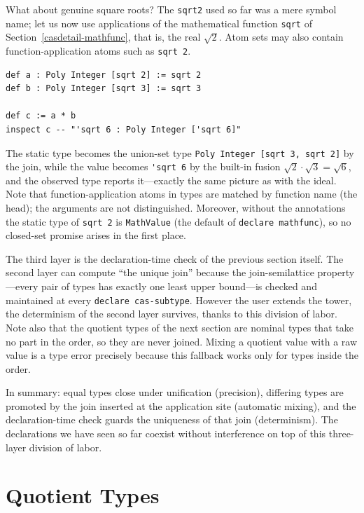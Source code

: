 What about genuine square roots?
The \lstinline{sqrt2} used so far was a mere symbol name; let us now use applications of the mathematical function \lstinline{sqrt} of Section~\ref{casdetail-mathfunc}, that is, the real $\sqrt{2}$.
Atom sets may also contain function-application atoms such as \lstinline{sqrt 2}.
\begin{lstlisting}[language=egison,numbers=none]
def a : Poly Integer [sqrt 2] := sqrt 2
def b : Poly Integer [sqrt 3] := sqrt 3

def c := a * b
inspect c -- "'sqrt 6 : Poly Integer ['sqrt 6]"
\end{lstlisting}
The static type becomes the union-set type \lstinline{Poly Integer [sqrt 3, sqrt 2]} by the join, while the value becomes \lstinline{'sqrt 6} by the built-in fusion $\sqrt{2} \cdot \sqrt{3} = \sqrt{6}$, and the observed type reports it---exactly the same picture as with the ideal.
Note that function-application atoms in types are matched by function name (the head); the arguments are not distinguished.
Moreover, without the annotations the static type of \lstinline{sqrt 2} is \lstinline{MathValue} (the default of \lstinline{declare mathfunc}), so no closed-set promise arises in the first place.

The third layer is the declaration-time check of the previous section itself.
The second layer can compute ``the unique join'' because the join-semilattice property---every pair of types has exactly one least upper bound---is checked and maintained at every \lstinline{declare cas-subtype}.
However the user extends the tower, the determinism of the second layer survives, thanks to this division of labor.
Note also that the quotient types of the next section are nominal types that take no part in the order, so they are never joined.
Mixing a quotient value with a raw value is a type error precisely because this fallback works only for types inside the order.

In summary: equal types close under unification (precision), differing types are promoted by the join inserted at the application site (automatic mixing), and the declaration-time check guards the uniqueness of that join (determinism).
The declarations we have seen so far coexist without interference on top of this three-layer division of labor.

\section{Quotient Types}\label{cas-quotient}

